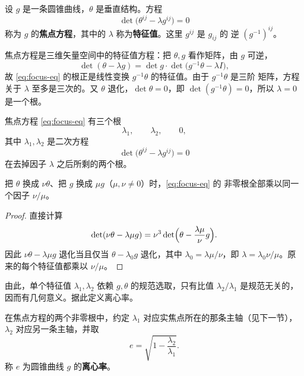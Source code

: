 \begin{definition}[焦点方程]
设 $g$ 是一条圆锥曲线，$\theta$ 是垂直结构。方程
\begin{equation}
\det\bigl(\theta^{ij}-\lambda g^{ij}\bigr)=0
\label{eq:focus-eq}
\end{equation}
称为 $g$ 的\textbf{焦点方程}，其中的 $\lambda$ 称为\textbf{特征值}。这里 $g^{ij}$ 是 $g_{ij}$ 的
逆 $(g^{-1})^{ij}$。
\end{definition}

焦点方程是三维矢量空间中的特征值方程：把 $\theta,g$ 看作矩阵，由 $g$ 可逆，
\[
\det(\theta-\lambda g)=\det g\cdot\det\bigl(g^{-1}\theta-\lambda I\bigr),
\]
故 \eqref{eq:focus-eq} 的根正是线性变换 $g^{-1}\theta$ 的特征值。由于 $g^{-1}\theta$ 是三阶
矩阵，方程关于 $\lambda$ 至多是三次的。又 $\theta$ 退化，$\det\theta=0$，即
$\det(g^{-1}\theta)=0$，所以 $\lambda=0$ 是一个根。

\begin{proposition}[特征值]
焦点方程 \eqref{eq:focus-eq} 有三个根
\[
\lambda_1,\qquad \lambda_2,\qquad 0,
\]
其中 $\lambda_1,\lambda_2$ 是二次方程
\[
\det\bigl(\theta^{ij}-\lambda g^{ij}\bigr)=0
\]
在去掉因子 $\lambda$ 之后所剩的两个根。
\end{proposition}

\begin{proposition}[规范变换下特征值的变化]
把 $\theta$ 换成 $\nu\theta$、把 $g$ 换成 $\mu g$（$\mu,\nu\ne0$）时，\eqref{eq:focus-eq} 的
非零根全部乘以同一个因子 $\nu/\mu$。
\end{proposition}

\begin{proof}
直接计算
\[
\det(\nu\theta-\lambda\mu g)
=\nu^3\det\Bigl(\theta-\frac{\lambda\mu}{\nu}g\Bigr).
\]
因此 $\nu\theta-\lambda\mu g$ 退化当且仅当 $\theta-\lambda_0g$ 退化，其中
$\lambda_0=\lambda\mu/\nu$，即 $\lambda=\lambda_0\nu/\mu$。原来的每个特征值都乘以 $\nu/\mu$。
\end{proof}

由此，单个特征值 $\lambda_1,\lambda_2$ 依赖 $g,\theta$ 的规范选取，只有比值
$\lambda_2/\lambda_1$ 是规范无关的，因而有几何意义。据此定义离心率。

\begin{definition}[离心率]
在焦点方程的两个非零根中，约定 $\lambda_1$ 对应实焦点所在的那条主轴（见下一节），$\lambda_2$
对应另一条主轴，并取
\begin{equation}
e=\sqrt{1-\frac{\lambda_2}{\lambda_1}}.
\label{eq:ecc}
\end{equation}
称 $e$ 为圆锥曲线 $g$ 的\textbf{离心率}。
\end{definition}

